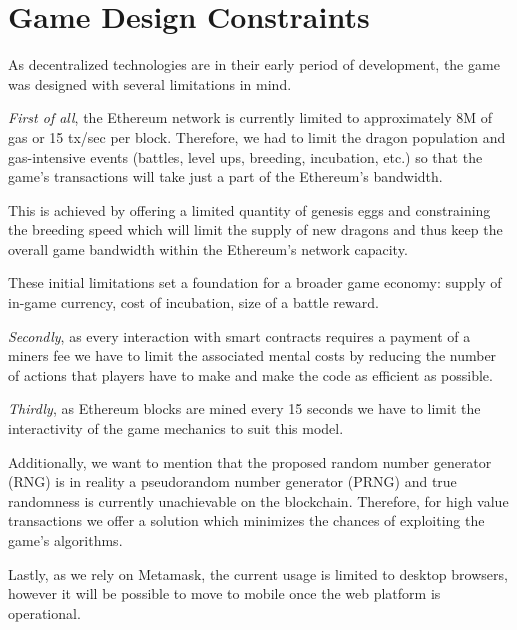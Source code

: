 \documentclass[12pt]{article}
\begin{document}
\newpage
\vspace{\baselineskip}\section{Game Design Constraints}
\label{Game Design Constraints}   \par


As decentralized technologies are in their early period of development, the game was designed with several limitations in mind.\par

\textit{First of all}, the Ethereum network is currently limited to approximately 8M of gas or 15 tx/sec per block. Therefore, we had to limit the dragon population and gas-intensive events (battles, level ups, breeding, incubation, etc.) so that the game’s transactions will take just a part of the Ethereum’s bandwidth.\par

This is achieved by offering a limited quantity of genesis eggs and constraining the breeding speed which will limit the supply of new dragons and thus keep the overall game bandwidth within the Ethereum’s network capacity.\par

These initial limitations set a foundation for a broader game economy: supply of in-game currency, cost of incubation, size of a battle reward.\par

\textit{Secondly}, as every interaction with smart contracts requires a payment of a miners fee we have to limit the associated mental costs by reducing the number of actions that players have to make and make the code as efficient as possible.\par

\textit{Thirdly}, as Ethereum blocks are mined every 15 seconds we have to limit the interactivity of the game mechanics to suit this model.\par

Additionally, we want to mention that the proposed random number generator (RNG) is in reality a pseudorandom number generator (PRNG) and true randomness is currently unachievable on the blockchain. Therefore, for high value transactions we offer a solution which minimizes the chances of exploiting the game’s algorithms.\par

Lastly, as we rely on Metamask, the current usage is limited to desktop browsers, however it will be possible to move to mobile once the web platform is operational.
\end{document}
